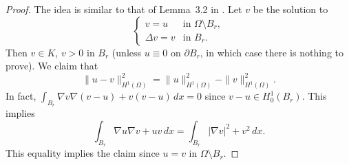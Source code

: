 \documentclass[11pt]{amsart}
\theoremstyle{definition}
\theoremstyle{remark}
\numberwithin{equation}{section}
\begin{document}
\begin{proof}
The idea is similar to that of Lemma~3.2 in \cite{AC}. Let $v$ be the solution to
\begin{equation}\label{harm.rep}
\begin{cases}
v=u & \text{in }\Omega\setminus B_r,\\
\Delta v=v & \text{in }B_r.
\end{cases}
\end{equation}
Then $v\in K$, $v>0$ in $B_r$ (unless $u\equiv0$ on $\partial B_r$, in which case there is nothing to prove). We claim that
\begin{equation}\label{pyth}
\|u-v\|^2_{H^1(\Omega)}=\|u\|^2_{H^1(\Omega)}-\|v\|^2_{H^1(\Omega)}.
\end{equation}
In fact, $\int_{B_r}\nabla v\nabla(v-u)+v(v-u)\,dx=0$ since $v-u\in H^1_0(B_r)$. This implies
\begin{equation}\label{pyth2}
\int_{B_r}\nabla u\nabla v+uv\,dx=\int_{B_r}|\nabla v|^2+v^2\,dx.
\end{equation}
This equality implies the claim since $u=v$ in $\Omega\setminus B_r$.


\end{proof}
\end{document}
